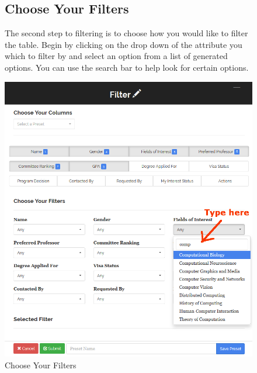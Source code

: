 \documentclass[fontsize=12pt,paper=letter,twoside]{scrartcl}
\begin{document}
\begin{figure}[!htb]
\subsection{Choose Your Filters}
The second step to filtering is to choose how you would like to filter the table. Begin by clicking on the drop down of the attribute you which to filter by and select an option from a list of generated options. You can use the search bar to help look for certain options.
\begin{center}
\includegraphics[width=.99\textwidth]{images/choose_filters.png}
\end{center}
\caption{Choose Your Filters}
\label{fig:choose_filters}
\end{figure}
\end{document}
